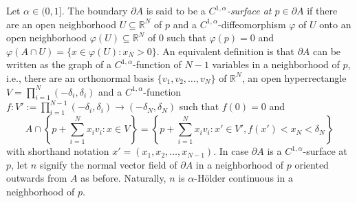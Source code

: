 \documentclass[graybox]{svmult}
\newcommand{\R}{\mathbb{R}}  %
\renewcommand{\AA}{A}  %
\newcommand{\pp}{p}
\begin{document}
Let $\alpha \in (0,1]$. 
The boundary $\partial \AA$ is said to be a \emph{$C^{1,\alpha}$-surface at $p\in \partial\AA$} if   there are an open neighborhood $U\subseteq\R^N$ of $\pp$ and a $C^{1,\alpha}$-diffeomorphism $\varphi$ of $U$ onto an open neighborhood  $\varphi(U)\subseteq \R^N$ of $0$  such that $\varphi(\pp)=0$ and $\varphi(A\cap U) = \{x \in \varphi(U): x_N>0\}$. 
An equivalent definition is that $\partial \AA$ can be written as the graph of a $C^{1,\alpha}$-function of $N-1$ variables in a neighborhood of $\pp$, i.e., there are an orthonormal basis $\{v_1,v_2,\dots, v_N\}$ of $\R^N$, an open hyperrectangle $V=\prod_{i=1}^N(-\delta_i,\delta_i)$ and  a $C^{1,\alpha}$-function $f\colon V':=\prod_{i=1}^{N-1} (-\delta_i,\delta_i) \to (-\delta_N,\delta_N)$ such that $f(0)=0$ and 
\begin{equation*} \label{eq:loc}
\AA \cap \left\{p+ \sum_{i=1}^N x_i v_i: x \in V \right\} = \left\{p +  \sum_{i=1}^N x_i v_i: x'\in V',  f(x') < x_N < \delta_N \right\}
\end{equation*}  
with shorthand notation $x'=(x_1,x_2,\dots, x_{N-1})$. 
In case $\partial \AA$ is a $C^{1,\alpha}$-surface at $\pp$, let $n$ signify the normal vector field of $\partial\AA$ in a neighborhood of $\pp$ oriented outwards from $\AA$ as before. Naturally, $n$ is $\alpha$-H\"older continuous in a neighborhood of $\pp$.  
\end{document}
